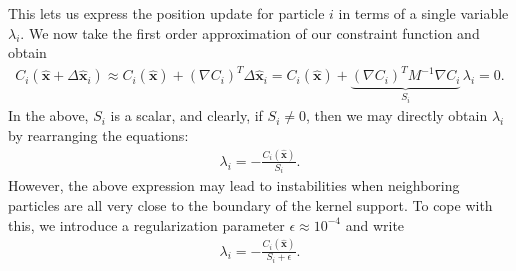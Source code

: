 \documentclass[11pt,a4paper,onesided]{vci_anim_exercise}
\renewcommand{\vec}[1]{\boldsymbol{\mathbf{#1}}}
\begin{document}
This lets us express the position update for particle $i$ in terms of a single variable $\lambda_i$. We now take the first order approximation of our constraint function and obtain
\begin{align}
C_i (\hat{\vec x} + \Delta \hat{\vec x}_i) \approx C_i(\hat{\vec x}) + (\nabla C_i)^T \Delta \hat{\vec x}_i
= C_i(\hat{\vec x}) + \underbrace{(\nabla C_i)^T M^{-1} \nabla C_i}_{S_i} \, \lambda_i = 0.
\label{eq:constraint_linearization}
\end{align}
In the above, $S_i$ is a scalar, and clearly, if $S_i \neq 0$, then we may directly obtain $\lambda_i$ by rearranging the equations:
\begin{align}
\lambda_i = - \frac{C_i (\hat{\vec x})}{S_i}.
\end{align}
However, the above expression may lead to instabilities when neighboring particles are all very close to the boundary of the kernel support. To cope with this, we introduce a regularization parameter $\epsilon \approx 10^{-4}$ and write
\begin{align}
\lambda_i = - \frac{C_i (\hat{\vec x})}{S_i + \epsilon}.
\end{align}
\end{document}
